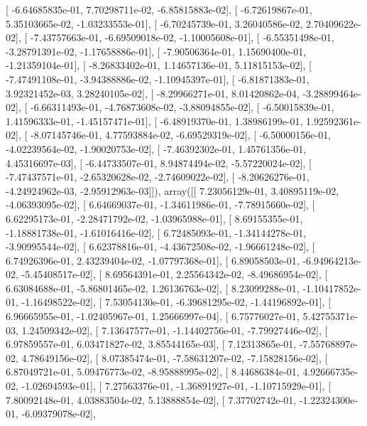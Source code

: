 \documentclass{article}
\begin{document}
       [ -6.64685835e-01,   7.70298711e-02,  -6.85815883e-02],
       [ -6.72619867e-01,   5.35103665e-02,  -1.03233553e-01],
       [ -6.70245739e-01,   3.26040586e-02,   2.70409622e-02],
       [ -7.43757663e-01,  -6.69509018e-02,  -1.10005608e-01],
       [ -6.55351498e-01,  -3.28791391e-02,  -1.17658886e-01],
       [ -7.90506364e-01,   1.15690400e-01,  -1.21359104e-01],
       [ -8.26833402e-01,   1.14657136e-01,   5.11815153e-02],
       [ -7.47491108e-01,  -3.94388886e-02,  -1.10945397e-01],
       [ -6.81871383e-01,   3.92321452e-03,   3.28240105e-02],
       [ -8.29966271e-01,   8.01420862e-04,  -3.28899464e-02],
       [ -6.66311493e-01,  -4.76873608e-02,  -3.88094855e-02],
       [ -6.50015839e-01,   1.41596333e-01,  -1.45157471e-01],
       [ -6.48919370e-01,   1.38986199e-01,   1.92592361e-02],
       [ -8.07145746e-01,   4.77593884e-02,  -6.69529319e-02],
       [ -6.50000156e-01,  -4.02239564e-02,  -1.90020753e-02],
       [ -7.46392302e-01,   1.45761356e-01,   4.45316697e-03],
       [ -6.44733507e-01,   8.94874494e-02,  -5.57220024e-02],
       [ -7.47437571e-01,  -2.65320628e-02,  -2.74609022e-02],
       [ -8.20626276e-01,  -4.24924962e-03,  -2.95912963e-03]]), array([[  7.23056129e-01,   3.40895119e-02,  -4.06393095e-02],
       [  6.64669037e-01,  -1.34611986e-01,  -7.78915660e-02],
       [  6.62295173e-01,  -2.28471792e-02,  -1.03965988e-01],
       [  8.69155355e-01,  -1.18881738e-01,  -1.61016416e-02],
       [  6.72485093e-01,  -1.34144278e-01,  -3.90995544e-02],
       [  6.62378816e-01,  -4.43672508e-02,  -1.96661248e-02],
       [  6.74926396e-01,   2.43239404e-02,  -1.07797368e-01],
       [  6.89058503e-01,  -6.94964213e-02,  -5.45408517e-02],
       [  8.69564391e-01,   2.25564342e-02,  -8.49686954e-02],
       [  6.63084688e-01,  -5.86801465e-02,   1.26136763e-02],
       [  8.23099288e-01,  -1.10417852e-01,  -1.16498522e-02],
       [  7.53054130e-01,  -6.39681295e-02,  -1.44196892e-01],
       [  6.96665955e-01,  -1.02405967e-01,   1.25666997e-04],
       [  6.75776027e-01,   5.42755371e-03,   1.24509342e-02],
       [  7.13647577e-01,  -1.14402756e-01,  -7.79927446e-02],
       [  6.97859557e-01,   6.03471827e-02,   3.85544165e-03],
       [  7.12313865e-01,  -7.55768897e-02,   4.78649156e-02],
       [  8.07385474e-01,  -7.58631207e-02,  -7.15828156e-02],
       [  6.87049721e-01,   5.09476773e-02,  -8.95888995e-02],
       [  8.44686384e-01,   4.92666735e-02,  -1.02694593e-01],
       [  7.27563376e-01,  -1.36891927e-01,  -1.10715929e-01],
       [  7.80092148e-01,   4.03883504e-02,   5.13888854e-02],
       [  7.37702742e-01,  -1.22324300e-01,  -6.09379078e-02],
\end{document}
